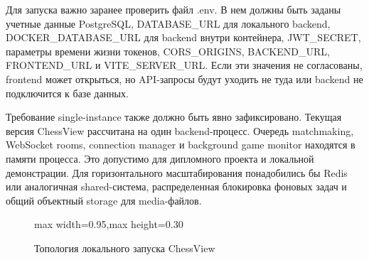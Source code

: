 Для запуска важно заранее проверить файл .env. В нем должны быть заданы учетные данные PostgreSQL, DATABASE_URL для локального backend, DOCKER_DATABASE_URL для backend внутри контейнера, JWT_SECRET, параметры времени жизни токенов, CORS_ORIGINS, BACKEND_URL, FRONTEND_URL и VITE_SERVER_URL. Если эти значения не согласованы, frontend может открыться, но API-запросы будут уходить не туда или backend не подключится к базе данных.

Требование single-instance также должно быть явно зафиксировано. Текущая версия ChessView рассчитана на один backend-процесс. Очередь matchmaking, WebSocket rooms, connection manager и background game monitor находятся в памяти процесса. Это допустимо для дипломного проекта и локальной демонстрации. Для горизонтального масштабирования понадобились бы Redis или аналогичная shared-система, распределенная блокировка фоновых задач и общий объектный storage для media-файлов.

\begin{figure}[H]
\centering
\begin{adjustbox}{max width=0.95\textwidth,max height=0.30\textheight}
\end{adjustbox}
\caption{Топология локального запуска ChessView}\label{fig:deploy-topology}
\end{figure}
